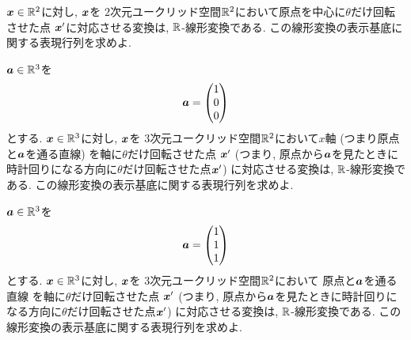 \begin{quiz}
  $\boldsymbol{x}\in \mathbb{R}^2$に対し,
  $\boldsymbol{x}$を
  $2$次元ユークリッド空間$\mathbb{R}^2$において原点を中心に$\theta$だけ回転させた点
  $\boldsymbol{x}'$に対応させる変換は,
  $\mathbb{R}$-線形変換である.
  この線形変換の表示基底に関する表現行列を求めよ.
\end{quiz}

\begin{quiz}
  $\boldsymbol{a}\in\mathbb{R}^3$を
  \begin{align*}
    \boldsymbol{a}=\begin{pmatrix}1\\0\\0\end{pmatrix}
  \end{align*}
  とする.
  $\boldsymbol{x}\in \mathbb{R}^3$に対し,
  $\boldsymbol{x}$を
  $3$次元ユークリッド空間$\mathbb{R}^2$において$x$軸
  (つまり原点と$\boldsymbol{a}$を通る直線)
  を軸に$\theta$だけ回転させた点
  $\boldsymbol{x}'$
  (つまり,
  原点から$\boldsymbol{a}$を見たときに時計回りになる方向に$\theta$だけ回転させた点$\boldsymbol{x}'$)
  に対応させる変換は,
  $\mathbb{R}$-線形変換である.
  この線形変換の表示基底に関する表現行列を求めよ.
\end{quiz}

\begin{quiz}
  $\boldsymbol{a}\in\mathbb{R}^3$を
  \begin{align*}
    \boldsymbol{a}=\begin{pmatrix}1\\1\\1\end{pmatrix}
  \end{align*}
  とする.
  $\boldsymbol{x}\in \mathbb{R}^3$に対し,
  $\boldsymbol{x}$を
  $3$次元ユークリッド空間$\mathbb{R}^2$において
  原点と$\boldsymbol{a}$を通る直線
  を軸に$\theta$だけ回転させた点
  $\boldsymbol{x}'$
  (つまり,
  原点から$\boldsymbol{a}$を見たときに時計回りになる方向に$\theta$だけ回転させた点$\boldsymbol{x}'$)
  に対応させる変換は,
  $\mathbb{R}$-線形変換である.
  この線形変換の表示基底に関する表現行列を求めよ.
\end{quiz}


